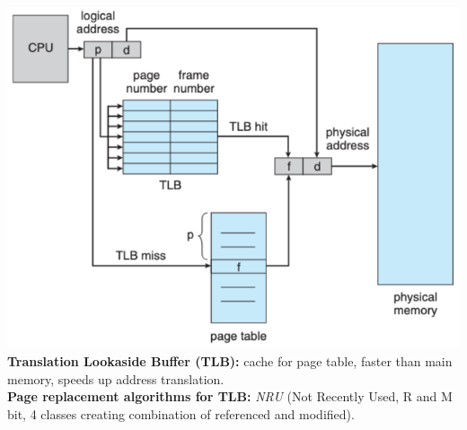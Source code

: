 \includegraphics[width=\linewidth]{figs/mmu-with-tlb.png}\\
\textbf{Translation Lookaside Buffer (TLB):} cache for page table, faster than main memory, speeds up address translation.\\
\textbf{Page replacement algorithms for TLB:} \textit{NRU} (Not Recently Used, R and M bit, 4 classes creating combination of referenced and modified).\\
